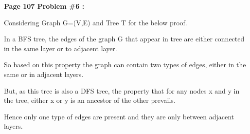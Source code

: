 \documentclass[letterpaper,portrait,12pt]{article}
\begin{document}
\begin{flushleft}

\end{flushleft}


\begin{flushleft}
\textbf{Page 107 Problem \#6 :}
\end{flushleft}


\begin{flushleft}

\end{flushleft}


\begin{flushleft}
Considering Graph G=(V,E) and Tree T for the below proof.
\end{flushleft}


\begin{flushleft}

\end{flushleft}


\begin{flushleft}
In a BFS tree, the edges of the graph G that appear in tree are either connected in the same layer or to adjacent layer.
\end{flushleft}


\begin{flushleft}

\end{flushleft}


\begin{flushleft}
So based on this property the graph can contain two types of edges, either in the same or in adjacent layers.
\end{flushleft}


\begin{flushleft}

\end{flushleft}


\begin{flushleft}
But, as this tree is also a DFS tree, the property that for any nodes x and y in the tree, either x or y is an ancestor of the other prevails.
\end{flushleft}


\begin{flushleft}

\end{flushleft}


\begin{flushleft}
Hence only one type of edges are present and they are only between adjacent layers.
\end{flushleft}
\end{document}
